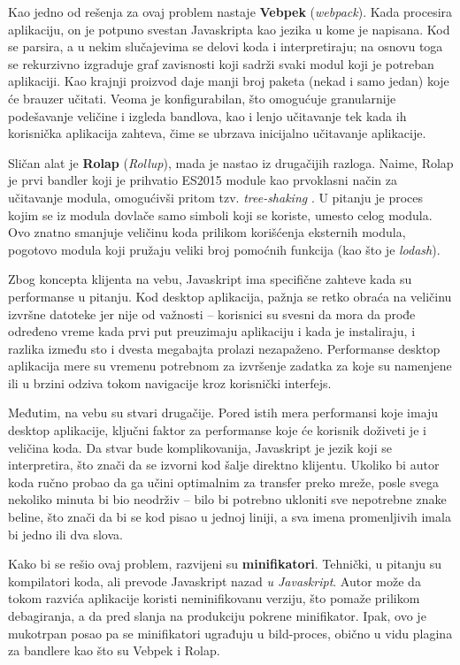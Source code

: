 Kao jedno od rešenja za ovaj problem nastaje \textbf{Vebpek} (\textsl{webpack}).
Kada procesira aplikaciju, on je potpuno svestan Javaskripta kao jezika u kome je napisana.
Kod se parsira, a u nekim slučajevima se delovi koda i interpretiraju; na osnovu toga se rekurzivno izgraduje graf zavisnosti koji sadrži svaki modul koji je potreban aplikaciji.
Kao krajnji proizvod daje manji broj paketa (nekad i samo jedan) koje će brauzer učitati.
Veoma je konfigurabilan, što omogućuje granularnije podešavanje veličine i
izgleda bandlova, kao i lenjo učitavanje tek kada ih korisnička aplikacija zahteva, čime se ubrzava inicijalno učitavanje aplikacije.

Sličan alat je \textbf{Rolap} (\textsl{Rollup}), mada je nastao iz drugačijih razloga.
Naime, Rolap je prvi bandler koji je prihvatio ES2015 module kao prvoklasni način za učitavanje modula, omogućivši pritom tzv. \textit{tree-shaking} \cite{rollup-guide}.
U pitanju je proces kojim se iz modula dovlače samo simboli koji se koriste, umesto celog modula.
Ovo znatno smanjuje veličinu koda prilikom korišćenja eksternih modula, pogotovo modula koji pružaju veliki broj pomoćnih funkcija (kao što je \textit{lodash}).

Zbog koncepta klijenta na vebu, Javaskript ima specifične zahteve kada su performanse u pitanju.
Kod desktop aplikacija, pažnja se retko obraća na veličinu izvršne datoteke jer nije od važnosti -- korisnici su svesni da mora da prođe određeno vreme kada prvi put preuzimaju aplikaciju i kada je instaliraju, i razlika između sto i dvesta megabajta prolazi nezapaženo.
Performanse desktop aplikacija mere su vremenu potrebnom za izvršenje zadatka za koje su namenjene ili u brzini odziva tokom navigacije kroz korisnički interfejs.

Međutim, na vebu su stvari drugačije.
Pored istih mera performansi koje imaju desktop aplikacije, ključni faktor za performanse koje će korisnik doživeti je i veličina koda.
Da stvar bude komplikovanija, Javaskript je jezik koji se interpretira, što znači da se izvorni kod šalje direktno klijentu.
Ukoliko bi autor koda ručno probao da ga učini optimalnim za transfer preko mreže, posle svega nekoliko minuta bi bio neodrživ -- bilo bi potrebno ukloniti sve nepotrebne znake beline, što znači da bi se kod pisao u jednoj liniji, a sva imena promenljivih imala bi jedno ili dva slova.

Kako bi se rešio ovaj problem, razvijeni su \textbf{minifikatori}.
Tehnički, u pitanju su kompilatori koda, ali prevode Javaskript nazad \emph{u Javaskript}.
Autor može da tokom razvića aplikacije koristi neminifikovanu verziju, što pomaže prilikom debagiranja, a da pred slanja na produkciju pokrene minifikator.
Ipak, ovo je mukotrpan posao pa se minifikatori ugrađuju u bild-proces, obično u vidu plagina za bandlere kao što su Vebpek i Rolap.

